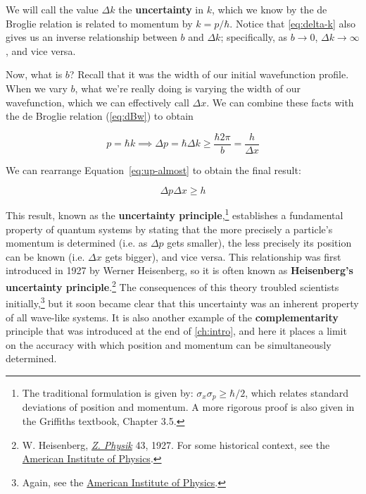 We will call the value $\Delta k$ the \textbf{uncertainty} in $k$, which we know by the de Broglie relation is related to momentum by $k=p/\hbar$. 
Notice that \autoref{eq:delta-k} also gives us an inverse relationship between $b$ and $\Delta k$; specifically, as $b \rightarrow 0$, $\Delta k \rightarrow \infty$, and vice versa. 

Now, what is $b$? 
Recall that it was the width of our initial wavefunction profile. 
When we vary $b$, what we're really doing is varying the width of our wavefunction, which we can effectively call $\Delta x$. 
We can combine these facts with the de Broglie relation (\autoref{eq:dBw}) to obtain

\begin{equation}
	p = \hbar k \implies \Delta p = \hbar \Delta k \ge  \frac{\hbar 2\pi}{b} = \frac{h}{\Delta x} \label{eq:up-almost}
\end{equation}

We can rearrange Equation~\ref{eq:up-almost} to obtain the final result:

\begin{tcolorbox}[title = Uncertainty principle] \vspace{-2ex}
	\begin{equation}
		\Delta p \Delta x \ge h \label{eq:up}
	\end{equation}
\end{tcolorbox}

This result, known as the \textbf{uncertainty principle},\footnote{The traditional formulation is given by: $\sigma_x\sigma_p \ge \hbar/2$, which relates standard deviations of position and momentum. A more rigorous proof is also given in the Griffiths textbook, Chapter 3.5.} establishes a fundamental property of quantum systems by stating that the more precisely a particle's momentum is determined (i.e. as $\Delta p$ gets smaller), the less precisely its position can be known (i.e. $\Delta x$ gets bigger), and vice versa. 
This relationship was first introduced in 1927 by Werner Heisenberg, so it is often known as \textbf{Heisenberg's uncertainty principle}.\footnote{W. Heisenberg, \href{https://doi.org/10.1007/BF01397280}{\emph{Z. Physik}} 43, 1927. For some historical context, see the \href{https://history.aip.org/exhibits/heisenberg/uncertainty-principle.html}{American Institute of Physics}.} 
The consequences of this theory troubled scientists initially,\footnote{Again, see the \href{http://history.aip.org/exhibits/heisenberg/}{American Institute of Physics}.} but it soon became clear that this uncertainty was an inherent property of all wave-like systems. 
It is also another example of the \textbf{complementarity} principle that was introduced at the end of \autoref{ch:intro}, and here it places a limit on the accuracy with which position and momentum can be simultaneously determined.


